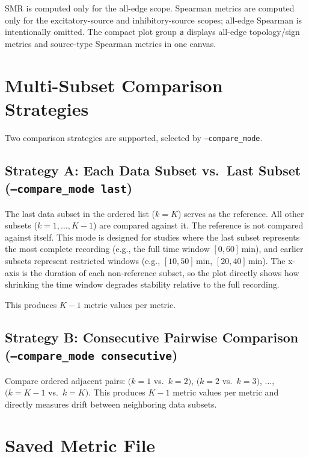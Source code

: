 \documentclass[11pt]{article}
\begin{document}
SMR is computed only for the all-edge scope. Spearman metrics are computed only for the excitatory-source and inhibitory-source scopes; all-edge Spearman is intentionally omitted. The compact plot group \texttt{a} displays all-edge topology/sign metrics and source-type Spearman metrics in one canvas.

\section{Multi-Subset Comparison Strategies}
\label{sec:strategies}

Two comparison strategies are supported, selected by \texttt{--compare\_mode}.

\subsection*{Strategy A: Each Data Subset vs.\ Last Subset (\texttt{--compare\_mode last})}

The last data subset in the ordered list ($k = K$) serves as the reference. All other subsets ($k = 1, \dots, K-1$) are compared against it. The reference is not compared against itself. This mode is designed for studies where the last subset represents the most complete recording (e.g., the full time window $[0, 60]$\,min), and earlier subsets represent restricted windows (e.g., $[10, 50]$\,min, $[20, 40]$\,min). The x-axis is the duration of each non-reference subset, so the plot directly shows how shrinking the time window degrades stability relative to the full recording.

This produces $K-1$ metric values per metric.

\subsection*{Strategy B: Consecutive Pairwise Comparison (\texttt{--compare\_mode consecutive})}

Compare ordered adjacent pairs: $(k=1$ vs.\ $k=2)$, $(k=2$ vs.\ $k=3)$, $\ldots$, $(k=K-1$ vs.\ $k=K)$. This produces $K-1$ metric values per metric and directly measures drift between neighboring data subsets.

\section{Saved Metric File}
\label{sec:output}
\end{document}
